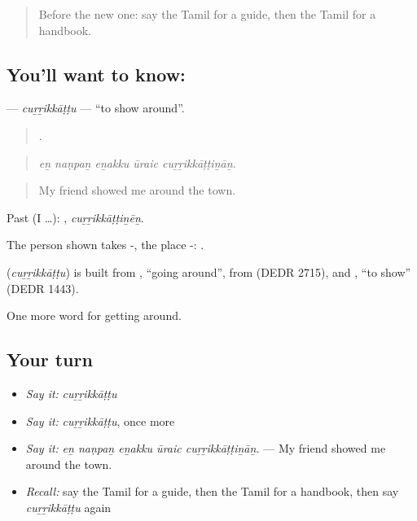 \label{lesson:TA-C421-currikkattu}



\begin{quote}
Before the new one: say the Tamil for a guide, then the Tamil for a handbook.
\end{quote}

\subsection*{You'll want to know: }
\textbf{} — \emph{cuṟṟikkāṭṭu} — \textquotedblleft{}to show around\textquotedblright{}.

\begin{quote}
    .
\end{quote}

\begin{quote}
\emph{eṉ naṇpaṉ eṉakku ūraic cuṟṟikkāṭṭiṉāṉ.}
\end{quote}

\begin{quote}
My friend showed me around the town.
\end{quote}

Past (I …): , \emph{cuṟṟikkāṭṭiṉēṉ}.

The person shown takes -, the place -:   .

\begin{cousinweb}
\textbf{} (\emph{cuṟṟikkāṭṭu}) is built from , \textquotedblleft{}going around\textquotedblright{}, from  (DEDR 2715), and , \textquotedblleft{}to show\textquotedblright{} (DEDR 1443).
\end{cousinweb}

\begin{grammarlens}[title={What you've built}]
One more word for getting around.
\end{grammarlens}

\subsection*{Your turn}
\begin{itemize}
\raggedright
  \item \emph{Say it:} \emph{cuṟṟikkāṭṭu}
  \item \emph{Say it:} \emph{cuṟṟikkāṭṭu}, once more
  \item \emph{Say it:} \emph{eṉ naṇpaṉ eṉakku ūraic cuṟṟikkāṭṭiṉāṉ.} — My friend showed me around the town.
  \item \emph{Recall:} say the Tamil for a guide, then the Tamil for a handbook, then say \emph{cuṟṟikkāṭṭu} again
\end{itemize}

